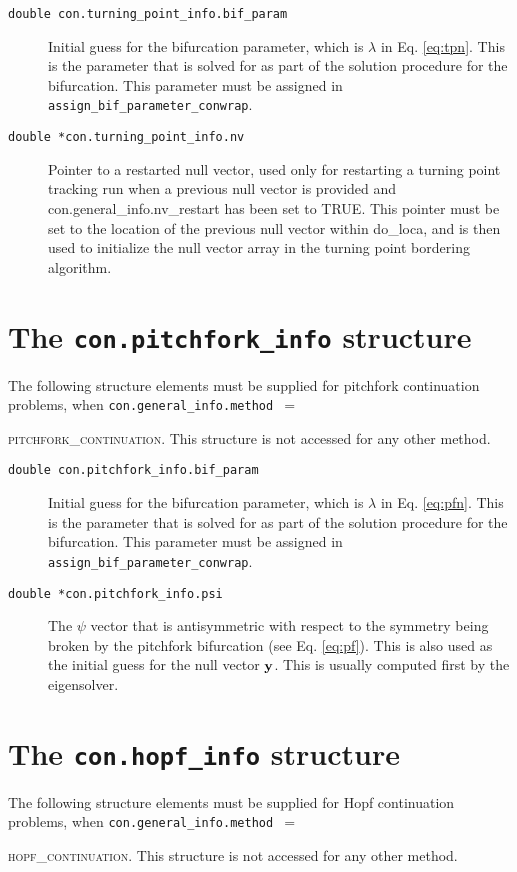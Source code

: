 {{\begin{description}
\item[\texttt{double con.turning\_point\_info.bif\_param}] Initial guess for the bifurcation parameter, which is $\lambda$ in Eq. \ref{eq:tpn}. This is the parameter that is solved for as part of the solution procedure for the bifurcation. This parameter must be assigned in \texttt{assign\_bif\_parameter\_conwrap}.
\item[\texttt{double *con.turning\_point\_info.nv}] Pointer to a restarted null vector, used only for restarting a turning point tracking run when a previous null vector is provided and con.general\_info.nv\_restart has been set to TRUE.  This pointer must be set to the location of the previous null vector within do\_loca, and is then used to initialize the null vector array in the turning point bordering algorithm.
\end{description}

\section{The \texttt{con.pitchfork\_info} structure}

The following structure elements must be supplied for pitchfork continuation problems, when \texttt{con.general\_info.method $=$}{\textsc{pitchfork\_continuation}. This structure is not accessed for any other method.

\begin{description}
\item[\texttt{double con.pitchfork\_info.bif\_param}] Initial guess for the bifurcation parameter, which is $\lambda$ in Eq. \ref{eq:pfn}. This is the parameter that is solved for as part of the solution procedure for the bifurcation. This parameter must be assigned in \texttt{assign\_bif\_parameter\_conwrap}.
\item[\texttt{double *con.pitchfork\_info.psi}] The $\psi$ vector that is antisymmetric with respect to the symmetry being broken by the pitchfork bifurcation (see Eq. \ref{eq:pf}). This is also used as the initial guess for the null vector ${\bf y}$. This is usually computed first by the eigensolver.
\end{description}

\section{The \texttt{con.hopf\_info} structure}

The following structure elements must be supplied for Hopf continuation problems, when \texttt{con.general\_info.method $=$}{\textsc{hopf\_continuation}. This structure is not accessed for any other method.

}}}}
